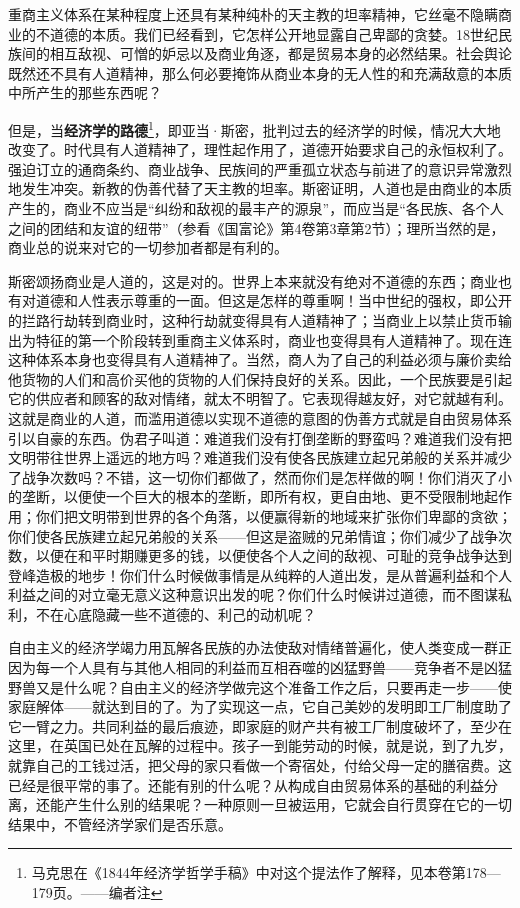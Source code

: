 \documentclass[a4paper,twoside,12pt,AutoFakeBold]{ctexart}
\begin{document}
重商主义体系在某种程度上还具有某种纯朴的天主教的坦率精神，它丝毫不隐瞒商业的不道德的本质。我们已经看到，它怎样公开地显露自己卑鄙的贪婪。18世纪民族间的相互敌视、可憎的妒忌以及商业角逐，都是贸易本身的必然结果。社会舆论既然还不具有人道精神，那么何必要掩饰从商业本身的无人性的和充满敌意的本质中所产生的那些东西呢？

但是，当\textbf{经济学的路德}\footnote{马克思在《1844年经济学哲学手稿》中对这个提法作了解释，见本卷第178—179页。——编者注}，即亚当·斯密，批判过去的经济学的时候，情况大大地改变了。时代具有人道精神了，理性起作用了，道德开始要求自己的永恒权利了。强迫订立的通商条约、商业战争、民族间的严重孤立状态与前进了的意识异常激烈地发生冲突。新教的伪善代替了天主教的坦率。斯密证明，人道也是由商业的本质产生的，商业不应当是“纠纷和敌视的最丰产的源泉”，而应当是“各民族、各个人之间的团结和友谊的纽带”（参看《国富论》第4卷第3章第2节）；理所当然的是，商业总的说来对它的一切参加者都是有利的。

斯密颂扬商业是人道的，这是对的。世界上本来就没有绝对不道德的东西；商业也有对道德和人性表示尊重的一面。但这是怎样的尊重啊！当中世纪的强权，即公开的拦路行劫转到商业时，这种行劫就变得具有人道精神了；当商业上以禁止货币输出为特征的第一个阶段转到重商主义体系时，商业也变得具有人道精神了。现在连这种体系本身也变得具有人道精神了。当然，商人为了自己的利益必须与廉价卖给他货物的人们和高价买他的货物的人们保持良好的关系。因此，一个民族要是引起它的供应者和顾客的敌对情绪，就太不明智了。它表现得越友好，对它就越有利。这就是商业的人道，而滥用道德以实现不道德的意图的伪善方式就是自由贸易体系引以自豪的东西。伪君子叫道：难道我们没有打倒垄断的野蛮吗？难道我们没有把文明带往世界上遥远的地方吗？难道我们没有使各民族建立起兄弟般的关系并减少了战争次数吗？不错，这一切你们都做了，然而你们是怎样做的啊！你们消灭了小的垄断，以便使一个巨大的根本的垄断，即所有权，更自由地、更不受限制地起作用；你们把文明带到世界的各个角落，以便赢得新的地域来扩张你们卑鄙的贪欲；你们使各民族建立起兄弟般的关系——但这是盗贼的兄弟情谊；你们减少了战争次数，以便在和平时期赚更多的钱，以便使各个人之间的敌视、可耻的竞争战争达到登峰造极的地步！你们什么时候做事情是从纯粹的人道出发，是从普遍利益和个人利益之间的对立毫无意义这种意识出发的呢？你们什么时候讲过道德，而不图谋私利，不在心底隐藏一些不道德的、利己的动机呢？

自由主义的经济学竭力用瓦解各民族的办法使敌对情绪普遍化，使人类变成一群正因为每一个人具有与其他人相同的利益而互相吞噬的凶猛野兽——竞争者不是凶猛野兽又是什么呢？自由主义的经济学做完这个准备工作之后，只要再走一步——使家庭解体——就达到目的了。为了实现这一点，它自己美妙的发明即工厂制度助了它一臂之力。共同利益的最后痕迹，即家庭的财产共有被工厂制度破坏了，至少在这里，在英国已处在瓦解的过程中。孩子一到能劳动的时候，就是说，到了九岁，就靠自己的工钱过活，把父母的家只看做一个寄宿处，付给父母一定的膳宿费。这已经是很平常的事了。还能有别的什么呢？从构成自由贸易体系的基础的利益分离，还能产生什么别的结果呢？一种原则一旦被运用，它就会自行贯穿在它的一切结果中，不管经济学家们是否乐意。
\end{document}
